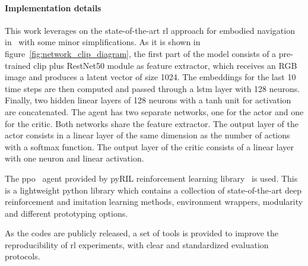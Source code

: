 \paragraph*{Implementation details}
This work leverages on the state-of-the-art \acrshort{rl} approach for embodied navigation in~\cite{khandelwal2022} with some minor simplifications.
As it is shown in figure~\ref{fig:network_clip_diagram}, the first part of the model consists of a pre-trained \acrfull{clip} plus RestNet50 module as feature extractor, which receives an RGB image and produces a latent vector of size 1024.
The embeddings for the last 10 time steps are then computed and passed through a \acrfull{lstm} layer with 128 neurons.
Finally, two hidden linear layers of 128 neurons with a tanh unit for activation are concatenated.
The agent has two separate networks, one for the actor and one for the critic.
Both networks share the feature extractor.
The output layer of the actor consists in a linear layer of the same dimension as the number of actions with a softmax function.
The output layer of the critic consists of a linear layer with one neuron and linear activation.

The \acrfull{ppo}~\cite{schulman2017} agent provided by pyRIL reinforcement learning library~\cite{pyRIL} is used.
This is a lightweight python library which contains a collection of state-of-the-art deep reinforcement and imitation learning methods, environment wrappers, modularity and different prototyping options.

As the codes are publicly released, a set of tools is provided to improve the reproducibility of \acrshort{rl} experiments, with clear and standardized evaluation protocols.

